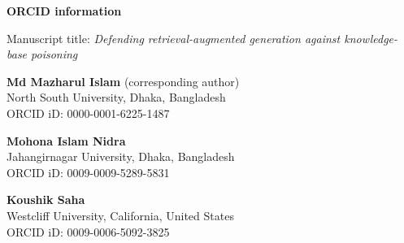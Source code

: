 \documentclass[12pt]{article}
\begin{document}
\begin{center}
{\large\bfseries ORCID information}
\end{center}

\bigskip

\noindent Manuscript title: \emph{Defending retrieval-augmented generation against
knowledge-base poisoning}

\bigskip

\noindent\textbf{Md Mazharul Islam} (corresponding author)\\
North South University, Dhaka, Bangladesh\\
ORCID iD: 0000-0001-6225-1487

\medskip

\noindent\textbf{Mohona Islam Nidra}\\
Jahangirnagar University, Dhaka, Bangladesh\\
ORCID iD: 0009-0009-5289-5831

\medskip

\noindent\textbf{Koushik Saha}\\
Westcliff University, California, United States\\
ORCID iD: 0009-0006-5092-3825
\end{document}
